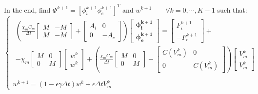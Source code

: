 \documentclass[a4paper,12pt]{article}
\begin{document}
In the end, find $\Phi^{k+1}=[\phi_i^{k+1} \phi_e^{k+1}]^T$ and $w^{k+1} \qquad \forall k=0, \cdots, K-1$ such that: 
\begin{equation}
\begin{cases}
\begin{gathered}
\left(
	\frac{\chi_m C_m}{\Delta t} \begin{bmatrix}M & -M \\ M & -M\end{bmatrix}
	+ \begin{bmatrix} A_i & 0 \\ 0 & -A_e \end{bmatrix}
	\right) \begin{bmatrix} \bm{\phi_i^{k+1}} \\ \bm{\phi_e^{k+1}}  \end{bmatrix} =
	\begin{bmatrix} F_i^{k+1} \\ -F_e^{k+1} \end{bmatrix} + \\ -
	\chi_m\begin{bmatrix} M & 0 \\ 0 & M \end{bmatrix} \begin{bmatrix} w^k \\ w^k \end{bmatrix} +
	\left(\frac{\chi_mC_m}{\Delta t}\begin{bmatrix} M & 0 \\ 0 & M \end{bmatrix}
	- \begin{bmatrix} C(V_m^k) & 0 \\ 0 & C(V_m^k)\end{bmatrix} 
	\right) \begin{bmatrix} V_m^k \\ V_m^k \end {bmatrix}
	 \end{gathered} \\ \\
	w^{k+1} = (1-\epsilon \gamma \Delta t) w^k + \epsilon \Delta tV_m^k
\end{cases}
\end{equation}
\end{document}
